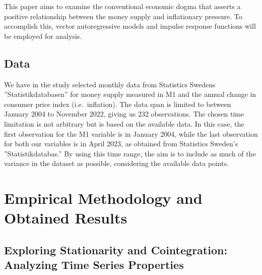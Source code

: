 \documentclass{article}
\begin{document}
    This paper aims to examine the conventional economic dogma that asserts a positive relationship
    between the money supply and inflationary pressure. To accomplish this, vector autoregressive
    models and impulse response functions will be employed for analysis.

    \newpage

    \subsection*{Data}
    We have in the study selected monthly data from Statistics Swedens ”Statistikdatabasen” for money
    supply measured in M1 and the annual change in consumer price index (i.e.\ inflation). The data
    span is limited to between January 2004 to November 2022, giving us 232 observations. The chosen
    time limitation is not arbitrary but is based on the available data. In this case, the first
    observation for the M1 variable is in January 2004, while the last observation for both our variables
    is in April 2023, as obtained from Statistics Sweden’s ”Statistikdatabas.” By using this time range,
    the aim is to include as much of the variance in the dataset as possible, considering the available
    data points.

    \section*{Empirical Methodology and Obtained Results}
    
    \subsection*{Exploring Stationarity and Cointegration: Analyzing Time Series Properties}
\end{document}
